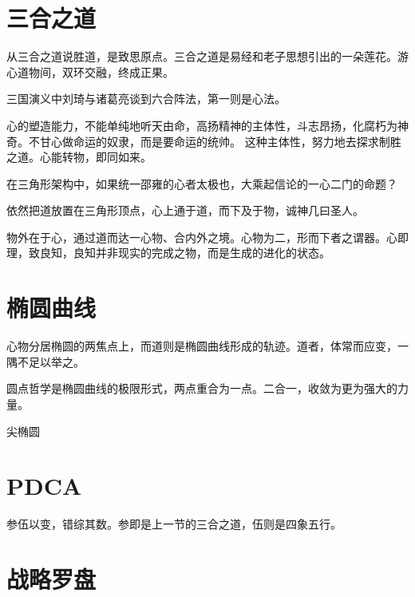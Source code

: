\section{三合之道}

从三合之道说胜道，是致思原点。三合之道是易经和老子思想引出的一朵莲花。游心道物间，双环交融，终成正果。

三国演义中刘琦与诸葛亮谈到六合阵法，第一则是心法。

心的塑造能力，不能单纯地听天由命，高扬精神的主体性，斗志昂扬，化腐朽为神奇。不甘心做命运的奴隶，而是要命运的统帅。
这种主体性，努力地去探求制胜之道。心能转物，即同如来。

在三角形架构中，如果统一邵雍的心者太极也，大乘起信论的一心二门的命题？

依然把道放置在三角形顶点，心上通于道，而下及于物，诚神几曰圣人。

物外在于心，通过道而达一心物、合内外之境。心物为二，形而下者之谓器。心即理，致良知，良知并非现实的完成之物，而是生成的进化的状态。

\section{椭圆曲线}

心物分居椭圆的两焦点上，而道则是椭圆曲线形成的轨迹。道者，体常而应变，一隅不足以举之。

圆点哲学是椭圆曲线的极限形式，两点重合为一点。二合一，收敛为更为强大的力量。

尖椭圆

\section{PDCA}

参伍以变，错综其数。参即是上一节的三合之道，伍则是四象五行。

\section{战略罗盘}
